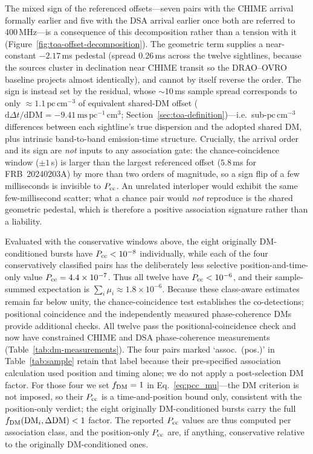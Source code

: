 The mixed sign of the referenced offsets---seven pairs with the CHIME arrival
formally earlier and five with the DSA arrival earlier once both are referred to
400\,MHz---is a consequence of this decomposition rather than a tension with it
(Figure~\ref{fig:toa-offset-decomposition}). The geometric term supplies a
near-constant $-2.17\,$ms pedestal (spread $0.26\,$ms across the twelve
sightlines, because the sources cluster in declination near CHIME transit so the
DRAO--OVRO baseline projects almost identically), and cannot by itself reverse
the order. The sign is instead set by the residual, whose $\sim\!10\,$ms
sample spread corresponds to only $\approx1.1\,\mathrm{pc\,cm^{-3}}$ of
equivalent shared-DM offset ($\mathrm{d}\Delta t/\mathrm{d}\mathrm{DM}=
-9.41\,\mathrm{ms\,pc^{-1}\,cm^{3}}$; Section~\ref{sec:toa-definition})---i.e.\
sub-$\mathrm{pc\,cm^{-3}}$ differences between each sightline's true dispersion
and the adopted shared DM, plus intrinsic band-to-band emission-time structure.
Crucially, the arrival order and its sign are \emph{not} inputs to any
association gate: the chance-coincidence window ($\pm1\,$s) is larger than the
largest referenced offset ($5.8\,$ms for FRB~20240203A) by more than two orders
of magnitude, so a sign flip of a few milliseconds is invisible to
$P_{\rm cc}$. An unrelated interloper would exhibit the same few-millisecond
scatter; what a chance pair would \emph{not} reproduce is the shared geometric
pedestal, which is therefore a positive association signature rather than a
liability.

Evaluated with the conservative windows above, the eight originally
DM-conditioned bursts
have $P_{\rm cc}<10^{-8}$ individually, while each of the four conservatively
classified pairs has the deliberately less selective position-and-time-only
value $P_{\rm cc}=4.4\times10^{-7}$. Thus all twelve have $P_{\rm cc}<10^{-6}$,
and their sample-summed expectation is $\sum_i\mu_i\approx1.8\times10^{-6}$.
Because these class-aware estimates remain far below unity, the
chance-coincidence test establishes the co-detections; positional coincidence
and the independently measured phase-coherence DMs provide additional checks.
All twelve pass the positional-coincidence check and now have constrained
CHIME and DSA phase-coherence measurements (Table~\ref{tab:dm-measurements}).
The four pairs marked `assoc.~(pos.)' in Table~\ref{tab:sample} retain that
label because their pre-specified association calculation used position and
timing alone; we do not apply a post-selection DM factor. For those four we set
$f_{\rm DM}=1$ in
Eq.~\eqref{eq:pcc_mu}---the DM criterion is not imposed, so their
$P_{\rm cc}$ is a time-and-position bound only, consistent with the
position-only verdict; the eight originally DM-conditioned bursts carry the full
$f_{\rm DM}(\mathrm{DM}_i,\Delta\mathrm{DM})<1$ factor. The reported
$P_{\rm cc}$ values are thus computed per association class, and the
position-only $P_{\rm cc}$ are, if anything, conservative relative to the
originally DM-conditioned ones.

